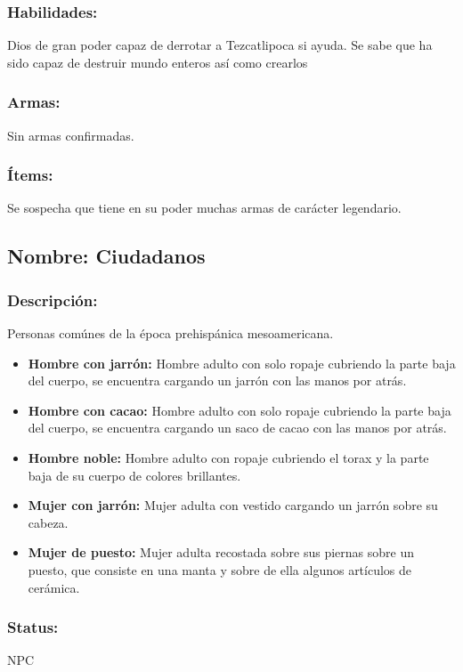 \documentclass[11pt,letterpaper]{article}
\begin{document}
\subsubsection{Habilidades:}
Dios de gran poder capaz de derrotar a Tezcatlipoca si ayuda. Se sabe que ha sido capaz de destruir mundo enteros así como crearlos
\subsubsection{Armas:}
Sin armas confirmadas.
\subsubsection{Ítems:}
Se sospecha que tiene en su poder muchas armas de carácter legendario.

\subsection{Nombre: Ciudadanos} \label{per.ciudadanos}  
\subsubsection{Descripción:}
Personas comúnes de la época prehispánica mesoamericana.
\begin{itemize}
	\item \textbf{Hombre con jarrón:}
	Hombre adulto con solo ropaje cubriendo la parte baja del cuerpo, se encuentra cargando un jarrón con las manos por atrás.
	\item \textbf{Hombre con cacao:}
	Hombre adulto con solo ropaje cubriendo la parte baja del cuerpo, se encuentra cargando un saco de cacao con las manos por atrás.
	\item \textbf{Hombre noble:}
	Hombre adulto con ropaje cubriendo el torax y la parte baja de su cuerpo de colores brillantes.	
	\item \textbf{Mujer con jarrón:}
	Mujer adulta con vestido cargando un jarrón sobre su cabeza.
	\item \textbf{Mujer de puesto:}
	Mujer adulta recostada sobre sus piernas sobre un puesto, que consiste en una manta y sobre de ella algunos artículos de cerámica.	
	\end{itemize} 
\subsubsection{Status:}
NPC
\end{document}

